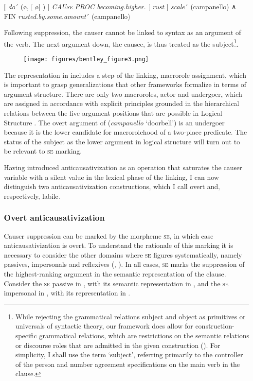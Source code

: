 \documentclass[output=paper,colorlinks,citecolor=brown
]{langscibook}
\begin{document}
\ea  \label{bentley_example_50}
    $\lbrack$ \textit{do}´ (\o, $\lbrack$ \o $\rbrack$ ) $\rbrack$ \textit{CAU\textsc{se} PROC becoming.higher. $\lbrack$ rust $\rbrack$ scale}´ (campanello) ∧ FIN \textit{rusted.by.some.amount}´ (campanello)
\z

Following suppression, the causer cannot be linked to syntax as an argument of the verb. The next argument down, the causee, is thus treated as the subject\footnote{While rejecting the grammatical relations subject and object as primitives or universals of syntactic theory, our framework does allow for construction-specific grammatical relations, which are restrictions on the semantic relations or discourse roles that are admitted in the given construction (\cites[242—309]{vanvalin2023principles}{lapolla2023grammatical}). For simplicity, I shall use the term ‘subject’, referring primarily to the controller of the person and number agreement specifications on the main verb in the clause.}.

\begin{figure}
\centering
\texttt{[image: figures/bentley\_figure3.png]}
\caption{}
\label{fig:bentley_figure_3}
\end{figure}    


The representation in  includes a step of the linking, macrorole assignment, which is important to grasp generalizations that other frameworks formalize in terms of argument structure. There are only two macroroles, actor and undergoer, which are assigned in accordance with explicit principles grounded in the hierarchical relations between the five argument positions that are possible in Logical Structure \citep[82—198]{vanvalin1997syntax}. The overt argument of  (\textit{campanello} ‘doorbell’) is an undergoer because it is the lower candidate for macrorolehood of a two-place predicate. The status of the subject as the lower argument in logical structure will turn out to be relevant to \textsc{se} marking. 

Having introduced anticausativization as an operation that saturates the causer variable with a silent value in the lexical phase of the linking, I can now distinguish two anticausativization constructions, which I call overt and, respectively, labile. 

\subsubsection{Overt anticausativization}
\label{bentley_section_5.4.1}
Causer suppression can be marked by the morpheme \textsc{se}, in which case anticausativization is overt. To understand the rationale of this marking it is necessary to consider the other domains where \textsc{se} figures systematically, namely passives, impersonals and reflexives (, ). In all cases, \textsc{se} marks the suppression of the highest-ranking argument in the semantic representation of the clause. Consider the \textsc{se} passive in , with its semantic representation in , and the \textsc{se} impersonal in , with its representation in .
\end{document}
